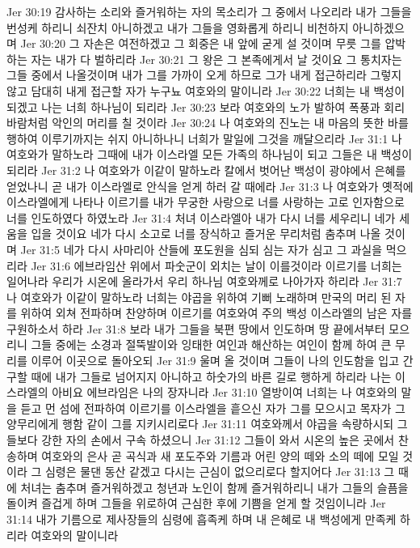Jer 30:19  감사하는 소리와 즐거워하는 자의 목소리가 그 중에서 나오리라 내가 그들을 번성케 하리니 쇠잔치 아니하겠고 내가 그들을 영화롭게 하리니 비천하지 아니하겠으며
Jer 30:20  그 자손은 여전하겠고 그 회중은 내 앞에 굳게 설 것이며 무릇 그를 압박하는 자는 내가 다 벌하리라
Jer 30:21  그 왕은 그 본족에게서 날 것이요 그 통치자는 그들 중에서 나올것이며 내가 그를 가까이 오게 하므로 그가 내게 접근하리라 그렇지 않고 담대히 내게 접근할 자가 누구뇨 여호와의 말이니라
Jer 30:22  너희는 내 백성이 되겠고 나는 너희 하나님이 되리라
Jer 30:23  보라 여호와의 노가 발하여 폭풍과 회리바람처럼 악인의 머리를 칠 것이라
Jer 30:24  나 여호와의 진노는 내 마음의 뜻한 바를 행하여 이루기까지는 쉬지 아니하나니 너희가 말일에 그것을 깨달으리라
Jer 31:1  나 여호와가 말하노라 그때에 내가 이스라엘 모든 가족의 하나님이 되고 그들은 내 백성이 되리라
Jer 31:2  나 여호와가 이같이 말하노라 칼에서 벗어난 백성이 광야에서 은혜를 얻었나니 곧 내가 이스라엘로 안식을 얻게 하러 갈 때에라
Jer 31:3  나 여호와가 옛적에 이스라엘에게 나타나 이르기를 내가 무궁한 사랑으로 너를 사랑하는 고로 인자함으로 너를 인도하였다 하였노라
Jer 31:4  처녀 이스라엘아 내가 다시 너를 세우리니 네가 세움을 입을 것이요 네가 다시 소고로 너를 장식하고 즐거운 무리처럼 춤추며 나올 것이며
Jer 31:5  네가 다시 사마리아 산들에 포도원을 심되 심는 자가 심고 그 과실을 먹으리라
Jer 31:6  에브라임산 위에서 파숫군이 외치는 날이 이를것이라 이르기를 너희는 일어나라 우리가 시온에 올라가서 우리 하나님 여호와께로 나아가자 하리라
Jer 31:7  나 여호와가 이같이 말하노라 너희는 야곱을 위하여 기뻐 노래하며 만국의 머리 된 자를 위하여 외쳐 전파하며 찬양하며 이르기를 여호와여 주의 백성 이스라엘의 남은 자를 구원하소서 하라
Jer 31:8  보라 내가 그들을 북편 땅에서 인도하며 땅 끝에서부터 모으리니 그들 중에는 소경과 절뚝발이와 잉태한 여인과 해산하는 여인이 함께 하여 큰 무리를 이루어 이곳으로 돌아오되
Jer 31:9  울며 올 것이며 그들이 나의 인도함을 입고 간구할 때에 내가 그들로 넘어지지 아니하고 하숫가의 바른 길로 행하게 하리라 나는 이스라엘의 아비요 에브라임은 나의 장자니라
Jer 31:10  열방이여 너희는 나 여호와의 말을 듣고 먼 섬에 전파하여 이르기를 이스라엘을 흩으신 자가 그를 모으시고 목자가 그 양무리에게 행함 같이 그를 지키시리로다
Jer 31:11  여호와께서 야곱을 속량하시되 그들보다 강한 자의 손에서 구속 하셨으니
Jer 31:12  그들이 와서 시온의 높은 곳에서 찬송하며 여호와의 은사 곧 곡식과 새 포도주와 기름과 어린 양의 떼와 소의 떼에 모일 것이라 그 심령은 물댄 동산 같겠고 다시는 근심이 없으리로다 할지어다
Jer 31:13  그 때에 처녀는 춤추며 즐거워하겠고 청년과 노인이 함께 즐거워하리니 내가 그들의 슬픔을 돌이켜 즐겁게 하며 그들을 위로하여 근심한 후에 기쁨을 얻게 할 것임이니라
Jer 31:14  내가 기름으로 제사장들의 심령에 흡족케 하며 내 은혜로 내 백성에게 만족케 하리라 여호와의 말이니라
